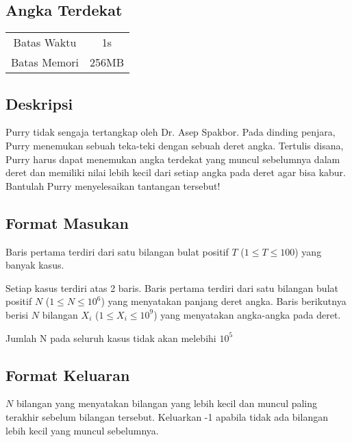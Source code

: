 \documentclass{article}
\begin{document}
\begin{center}

    
    \section*{Angka Terdekat} %

    \begin{tabular}{ | c c | }
        \hline
        Batas Waktu  & 1s \\    %
        Batas Memori & 256MB \\  %
        \hline
    \end{tabular}
\end{center}

\subsection*{Deskripsi}

Purry tidak sengaja tertangkap oleh Dr. Asep Spakbor. Pada dinding penjara, Purry menemukan sebuah teka-teki dengan sebuah deret angka. Tertulis disana, Purry harus dapat menemukan angka terdekat yang muncul sebelumnya dalam deret dan memiliki nilai lebih kecil dari setiap angka pada deret agar bisa kabur. Bantulah Purry menyelesaikan tantangan tersebut!

\subsection*{Format Masukan}

Baris pertama terdiri dari satu bilangan bulat positif $T$ ($1 \leq T \leq 100$)  yang banyak kasus.

Setiap kasus terdiri atas 2 baris. Baris pertama terdiri dari satu bilangan bulat positif $N$ ($1 \leq N \leq 10^{6}$)  yang menyatakan panjang deret angka.
Baris berikutnya berisi $N$ bilangan $X_i$ ($1 \leq X_i \leq 10^{9}$) yang menyatakan angka-angka pada deret.

Jumlah N pada seluruh kasus tidak akan melebihi $10^5$

\subsection*{Format Keluaran}

$N$ bilangan yang menyatakan bilangan yang lebih kecil dan muncul paling terakhir sebelum bilangan tersebut. Keluarkan -1 apabila tidak ada bilangan lebih kecil yang muncul sebelumnya.
\end{document}
